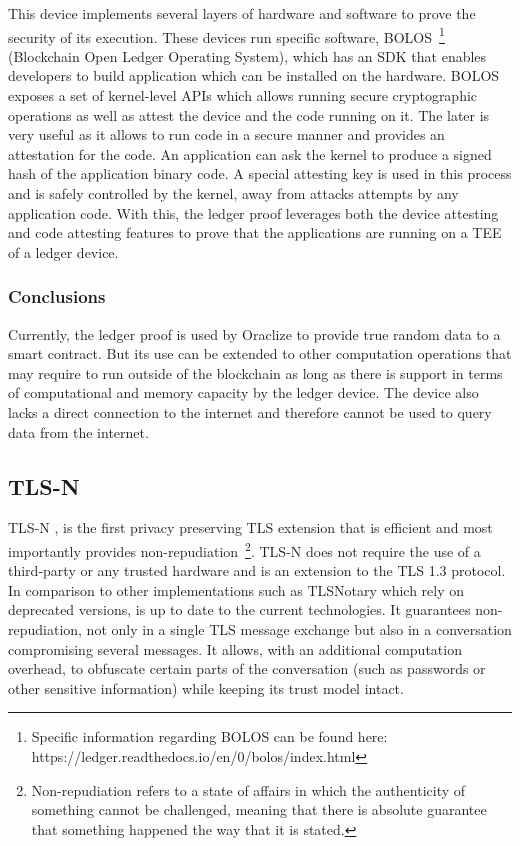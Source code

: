 This device implements several layers of hardware and software to prove the security of its execution. These devices run specific software, BOLOS~\footnote{Specific information regarding BOLOS can be found here: https://ledger.readthedocs.io/en/0/bolos/index.html} (Blockchain Open Ledger Operating System), which has an SDK that enables developers to build application which can be installed on the hardware. BOLOS exposes a set of kernel-level APIs which allows running secure cryptographic operations as well as attest the device and the code running on it. The later is very useful as it allows to run code in a secure manner and provides an attestation for the code. An application can ask the kernel to produce a signed hash of the application binary code. A special attesting key is used in this process and is safely controlled by the kernel, away from attacks attempts by any application code. With this, the ledger proof leverages both the device attesting and code attesting features to prove that the applications are running on a TEE of a ledger device.

\subsubsection{Conclusions}

Currently, the ledger proof is used by Oraclize to provide true random data to a smart contract. But its use can be extended to other computation operations that may require to run outside of the blockchain as long as there is support in terms of computational and memory capacity by the ledger device. The device also lacks a direct connection to the internet and therefore cannot be used to query data from the internet.


\subsection{TLS-N}


TLS-N \cite{Ritzdorf2017}, is the first privacy preserving TLS extension that is efficient and most importantly provides non-repudiation~\footnote{Non-repudiation refers to a state of affairs in which the authenticity of something cannot be challenged, meaning that there is absolute guarantee that something happened the way that it is stated.}. TLS-N does not require the use of a third-party or any trusted hardware and is an extension to the TLS 1.3 protocol. In comparison to other implementations such as TLSNotary which rely on deprecated versions, is up to date to the current technologies.
It guarantees non-repudiation, not only in a single TLS message exchange but also in a conversation compromising several messages. It allows, with an additional computation overhead, to obfuscate certain parts of the conversation (such as passwords or other sensitive information) while keeping its trust model intact.

